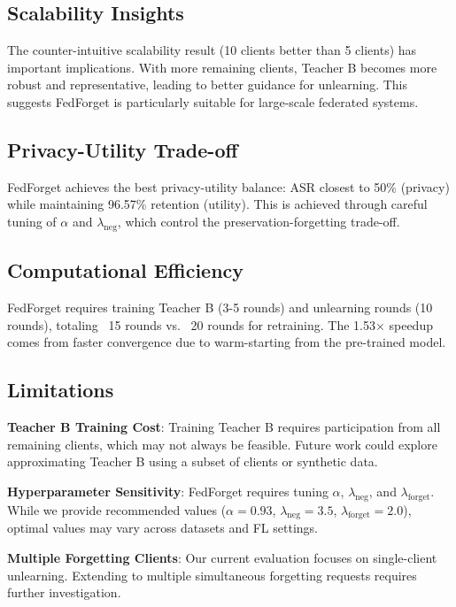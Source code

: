 \documentclass[10pt,twocolumn]{article}
\begin{document}
\subsection{Scalability Insights}

The counter-intuitive scalability result (10 clients better than 5 clients) has important implications. With more remaining clients, Teacher B becomes more robust and representative, leading to better guidance for unlearning. This suggests FedForget is particularly suitable for large-scale federated systems.

\subsection{Privacy-Utility Trade-off}

FedForget achieves the best privacy-utility balance: ASR closest to 50\% (privacy) while maintaining 96.57\% retention (utility). This is achieved through careful tuning of $\alpha$ and $\lambda_{\text{neg}}$, which control the preservation-forgetting trade-off.

\subsection{Computational Efficiency}

FedForget requires training Teacher B (3-5 rounds) and unlearning rounds (10 rounds), totaling ~15 rounds vs. ~20 rounds for retraining. The 1.53× speedup comes from faster convergence due to warm-starting from the pre-trained model.

\subsection{Limitations}

\textbf{Teacher B Training Cost}: Training Teacher B requires participation from all remaining clients, which may not always be feasible. Future work could explore approximating Teacher B using a subset of clients or synthetic data.

\textbf{Hyperparameter Sensitivity}: FedForget requires tuning $\alpha$, $\lambda_{\text{neg}}$, and $\lambda_{\text{forget}}$. While we provide recommended values ($\alpha=0.93$, $\lambda_{\text{neg}}=3.5$, $\lambda_{\text{forget}}=2.0$), optimal values may vary across datasets and FL settings.

\textbf{Multiple Forgetting Clients}: Our current evaluation focuses on single-client unlearning. Extending to multiple simultaneous forgetting requests requires further investigation.
\end{document}
